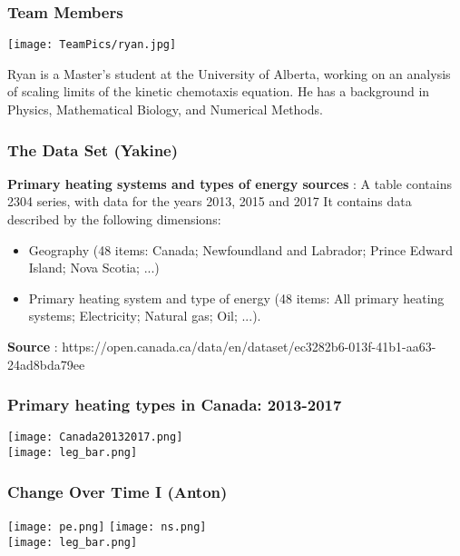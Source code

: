 \documentclass{beamer}
\begin{document}
\begin{frame}
\frametitle{Team Members}

\vspace{10pt}
\begin{minipage}[b]{0.15\textwidth}
\texttt{[image: TeamPics/ryan.jpg]}
\end{minipage}\hspace{0.05\textwidth}%
\begin{minipage}[b]{0.8\textwidth}
{\small Ryan is a Master’s student at the University of Alberta, working on an analysis of scaling limits of the kinetic chemotaxis equation. He has a background in Physics, Mathematical Biology, and Numerical Methods.}
\end{minipage}


\end{frame}





\begin{frame}
\frametitle{The Data Set (Yakine)}
\textbf{Primary heating systems and types of energy sources} : A table contains 2304 series, with data for the years 2013, 2015 and 2017
It contains data described by the following dimensions:
\begin{itemize}
\item Geography (48 items: Canada; Newfoundland and Labrador; Prince Edward Island; Nova Scotia; ...)
\item Primary heating system and type of energy (48 items: All primary heating systems; Electricity; Natural gas; Oil; ...).
\end{itemize}
\textbf{Source} : https://open.canada.ca/data/en/dataset/ec3282b6-013f-41b1-aa63-24ad8bda79ee
\end{frame}


\begin{frame}
\frametitle{Primary heating types in Canada: 2013-2017}
\texttt{[image: Canada20132017.png]}\\
\texttt{[image: leg\_bar.png]}
\end{frame}



\begin{frame}
\frametitle{Change Over Time I (Anton)}
\begin{center}
\texttt{[image: pe.png]}%
\texttt{[image: ns.png]}\\
\texttt{[image: leg\_bar.png]}
\end{center}
\end{frame}
\end{document}
